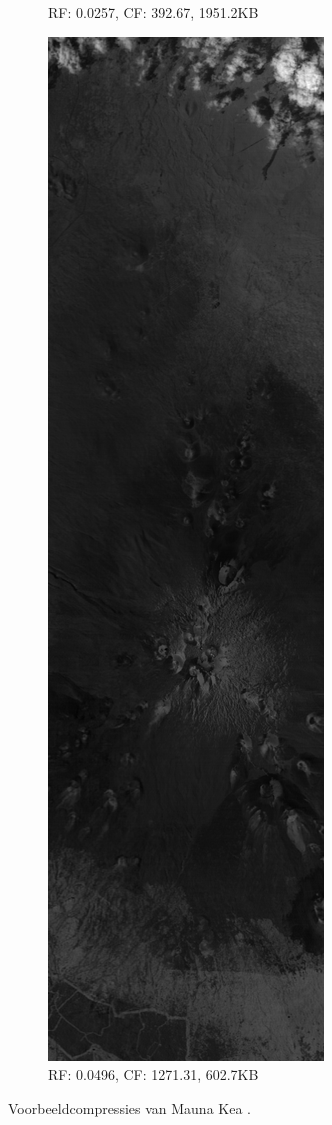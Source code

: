 \begin{figure}[]
\begin{subfigure}{0.48\textwidth}
  \caption{RF: 0.0257, CF: 392.67, 1951.2KB}
\end{subfigure}
\begin{subfigure}{0.48\textwidth}
  \centering
  \includegraphics[width=0.8\linewidth]{images/example_compression_Mauna_Kea_0_05.png}
  \caption{RF: 0.0496, CF: 1271.31, 602.7KB}
\end{subfigure}
\caption{Voorbeeldcompressies van Mauna Kea \cite{ref:aviris}.}
\end{figure}